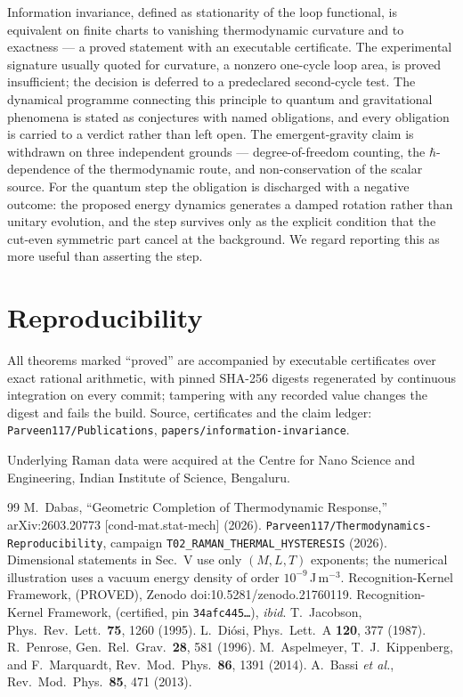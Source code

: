 \documentclass[aps,prd,twocolumn,superscriptaddress,nofootinbib]{revtex4-2}
\begin{document}
Information invariance, defined as stationarity of the loop functional, is
equivalent on finite charts to vanishing thermodynamic curvature and to
exactness --- a proved statement with an executable certificate. The
experimental signature usually quoted for curvature, a nonzero one-cycle loop
area, is proved insufficient; the decision is deferred to a predeclared
second-cycle test. The dynamical programme connecting this principle to quantum and gravitational
phenomena is stated as conjectures with named obligations, and every obligation
is carried to a verdict rather than left open. The emergent-gravity claim is
withdrawn on three independent grounds --- degree-of-freedom counting, the
$\hbar$-dependence of the thermodynamic route, and non-conservation of the
scalar source. For the quantum step
the obligation is discharged with a negative outcome: the proposed energy
dynamics generates a damped rotation rather than unitary evolution, and the
step survives only as the explicit condition that the cut-even symmetric part
cancel at the background. We regard reporting this as more useful than
asserting the step.

\section*{Reproducibility}
All theorems marked ``proved'' are accompanied by executable certificates over
exact rational arithmetic, with pinned SHA-256 digests regenerated by continuous
integration on every commit; tampering with any recorded value changes the
digest and fails the build. Source, certificates and the claim ledger:
\texttt{Parveen117/Publications}, \texttt{papers/information-invariance}.

\begin{acknowledgments}
Underlying Raman data were acquired at the Centre for Nano Science and
Engineering, Indian Institute of Science, Bengaluru.
\end{acknowledgments}

\begin{thebibliography}{99}
 M.~Dabas, ``Geometric Completion of Thermodynamic Response,''
arXiv:2603.20773 [cond-mat.stat-mech] (2026).
 \texttt{Parveen117/Thermodynamics-Reproducibility},
campaign \texttt{T02\_RAMAN\_THERMAL\_HYSTERESIS} (2026).
 Dimensional statements in Sec.~V use only $(M,L,T)$ exponents; the numerical illustration uses a vacuum energy density of order $10^{-9}$\,J\,m$^{-3}$.
 Recognition-Kernel Framework,  (PROVED), Zenodo doi:10.5281/zenodo.21760119.
 Recognition-Kernel Framework,  (certified, pin \texttt{34afc445\ldots}), \emph{ibid}.
 T.~Jacobson, Phys.\ Rev.\ Lett.\ \textbf{75}, 1260 (1995).
 L.~Di\'osi, Phys.\ Lett.\ A \textbf{120}, 377 (1987).
 R.~Penrose, Gen.\ Rel.\ Grav.\ \textbf{28}, 581 (1996).
 M.~Aspelmeyer, T.~J.~Kippenberg, and F.~Marquardt,
Rev.\ Mod.\ Phys.\ \textbf{86}, 1391 (2014).
 A.~Bassi \emph{et al.}, Rev.\ Mod.\ Phys.\ \textbf{85}, 471 (2013).
\end{thebibliography}
\end{document}
